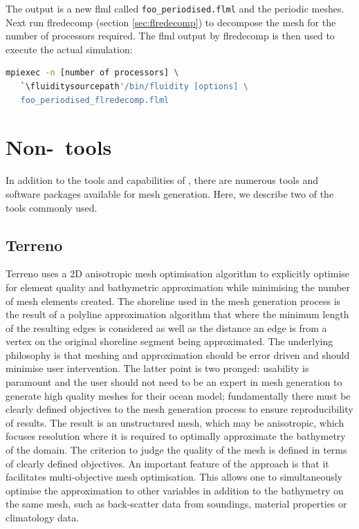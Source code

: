 The output is a new flml called \lstinline+foo_periodised.flml+ and the
periodic meshes. Next run flredecomp (section \ref{sec:flredecomp}) to decompose the mesh for the number of processors
required. The flml output by flredecomp is then used to execute the actual simulation:

\begin{lstlisting}[language=bash]
mpiexec -n [number of processors] \
   `\fluiditysourcepath'/bin/fluidity [options] \
   foo_periodised_flredecomp.flml
\end{lstlisting}

\section{Non-\fluidity\ tools}

In addition to the tools and capabilities of \fluidity, there are numerous
tools and software packages available for mesh generation. Here, we describe 
two of the tools commonly used.

\subsection{Terreno}
\label{sec:Terreno}

Terreno uses a 2D anisotropic mesh optimisation algorithm to explicitly optimise for 
element quality and bathymetric approximation while minimising the number of mesh
elements created. The shoreline used in the mesh generation process is the result 
of a polyline approximation algorithm that where the minimum length of the resulting 
edges is considered as well as the distance an edge is from a vertex on the original 
shoreline segment being approximated. The underlying philosophy is that meshing and 
approximation should be error driven and should minimise user intervention. The 
latter point is two pronged: usability is paramount and the user should not need 
to be an expert in mesh generation to generate high quality meshes for their ocean 
model; fundamentally there must be clearly defined objectives to the mesh generation 
process to ensure reproducibility of results. The result is an unstructured mesh, 
which may be anisotropic, which focuses resolution where it is required to optimally 
approximate the bathymetry of the domain. The criterion to judge the quality of the 
mesh is defined in terms of clearly defined objectives. An important feature of the 
approach is that it facilitates multi-objective mesh optimisation. This allows one to 
simultaneously optimise the approximation to other variables in addition to the 
bathymetry on the same mesh, such as back-scatter data from soundings, material 
properties or climatology data. 

